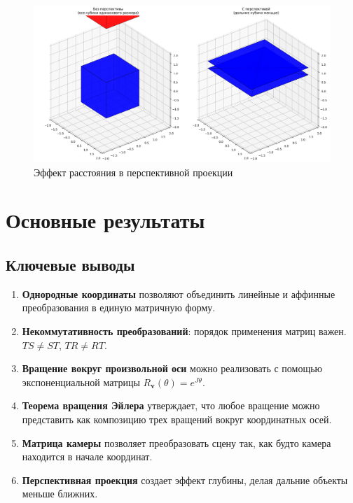 \begin{figure}[h]
\centering
\includegraphics[width=\textwidth]{images/task7/distance_effect_perspective.png}
\caption{Эффект расстояния в перспективной проекции}
\label{fig:distance_effect_perspective}
\end{figure}

\section*{Основные результаты}

\subsection*{Ключевые выводы}

\begin{enumerate}
\item \textbf{Однородные координаты} позволяют объединить линейные и аффинные преобразования в единую матричную форму.

\item \textbf{Некоммутативность преобразований}: порядок применения матриц важен. $TS \neq ST$, $TR \neq RT$.

\item \textbf{Вращение вокруг произвольной оси} можно реализовать с помощью экспоненциальной матрицы $R_{\mathbf{v}}(\theta) = e^{J\theta}$.

\item \textbf{Теорема вращения Эйлера} утверждает, что любое вращение можно представить как композицию трех вращений вокруг координатных осей.

\item \textbf{Матрица камеры} позволяет преобразовать сцену так, как будто камера находится в начале координат.

\item \textbf{Перспективная проекция} создает эффект глубины, делая дальние объекты меньше ближних.

\end{enumerate}

